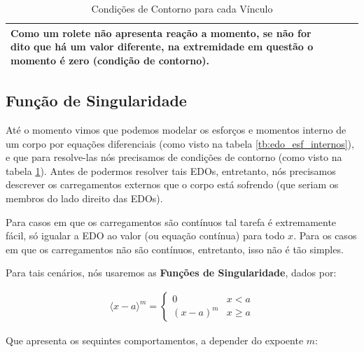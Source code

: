 \documentclass{article}
\begin{document}
\begin{table}[h]
\begin{tabular}{|l|c|l|}
        \begin{minipage}{.4\textwidth}
            \vspace{5px}
            Como um rolete não apresenta reação a momento, \textbf{se não for dito que há um valor diferente}, na extremidade em questão o momento é zero (condição de contorno).
        \end{minipage}               \\ \hline
    \end{tabular}
    \caption{Condições de Contorno para cada Vínculo}
    \label{tb:cond_contorno}
\end{table}

\newpage
\subsection{Função de Singularidade}
Até o momento vimos que podemos modelar os esforços e momentos interno de um corpo por equações diferenciais (como visto na tabela \ref{tb:edo_esf_internos}), e que para resolve-las
nós precisamos de condições de contorno (como visto na tabela \ref{tb:cond_contorno}). Antes de podermos resolver tais EDOs, entretanto, nós precisamos descrever os carregamentos
externos que o corpo está sofrendo (que seriam os membros do lado direito das EDOs).

Para casos em que os carregamentos são contínuos tal tarefa é extremamente fácil, só igualar a EDO ao valor (ou equação contínua) para todo $x$. Para os casos em que os carregamentos não são contínuos, entretanto, isso não é tão simples.

Para tais cenários, nós usaremos as \textbf{Funções de Singularidade}, dados por:

\begin{align}
    \langle x - a\rangle^m = \begin{cases}
                                 0       & x<a     \\
                                 (x-a)^m & x \ge a
                             \end{cases}
    \label{eq:func_singularidade}
\end{align}

Que apresenta os sequintes comportamentos, a depender do expoente $m$:
\end{document}
